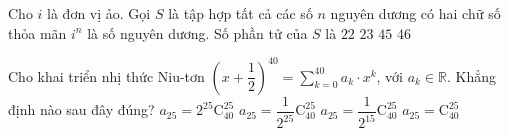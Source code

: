 \begin{ex}%
	Cho $i$ là đơn vị ảo. Gọi $S$ là tập hợp tất cả các số $n$ nguyên dương có hai chữ số thỏa mãn $i^n$ là số nguyên dương. Số phần tử của $S$ là	
	\choice
	{\True $22$}
	{$23$}
	{$45$}
	{$46$}
\end{ex}
\begin{ex}%
	Cho khai triển nhị thức Niu-tơn $\left(x+\dfrac{1}{2}\right)^{40}=\displaystyle\sum_{k=0}^{40}a_k\cdot x^k$, với $a_k \in \mathbb{R}$. Khẳng định nào sau đây đúng?	
	\choice
	{$a_{25}=2^{25}\mathrm{C}^{25}_{40}$}
	{$a_{25}=\dfrac{1}{2^{25}}\mathrm{C}^{25}_{40}$}
	{\True $a_{25}=\dfrac{1}{2^{15}}\mathrm{C}^{25}_{40}$}
	{$a_{25}=\mathrm{C}^{25}_{40}$}
\end{ex}
